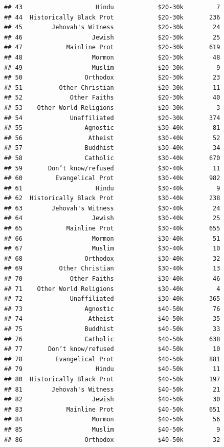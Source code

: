 \documentclass[12pt,letterpaperpaper,openany]{book}
\begin{document}
\begin{verbatim}
## 43                    Hindu            $20-30k         7
## 44  Historically Black Prot            $20-30k       236
## 45        Jehovah's Witness            $20-30k        24
## 46                   Jewish            $20-30k        25
## 47            Mainline Prot            $20-30k       619
## 48                   Mormon            $20-30k        48
## 49                   Muslim            $20-30k         9
## 50                 Orthodox            $20-30k        23
## 51          Other Christian            $20-30k        11
## 52             Other Faiths            $20-30k        40
## 53    Other World Religions            $20-30k         3
## 54             Unaffiliated            $20-30k       374
## 55                 Agnostic            $30-40k        81
## 56                  Atheist            $30-40k        52
## 57                 Buddhist            $30-40k        34
## 58                 Catholic            $30-40k       670
## 59       Don’t know/refused            $30-40k        11
## 60         Evangelical Prot            $30-40k       982
## 61                    Hindu            $30-40k         9
## 62  Historically Black Prot            $30-40k       238
## 63        Jehovah's Witness            $30-40k        24
## 64                   Jewish            $30-40k        25
## 65            Mainline Prot            $30-40k       655
## 66                   Mormon            $30-40k        51
## 67                   Muslim            $30-40k        10
## 68                 Orthodox            $30-40k        32
## 69          Other Christian            $30-40k        13
## 70             Other Faiths            $30-40k        46
## 71    Other World Religions            $30-40k         4
## 72             Unaffiliated            $30-40k       365
## 73                 Agnostic            $40-50k        76
## 74                  Atheist            $40-50k        35
## 75                 Buddhist            $40-50k        33
## 76                 Catholic            $40-50k       638
## 77       Don’t know/refused            $40-50k        10
## 78         Evangelical Prot            $40-50k       881
## 79                    Hindu            $40-50k        11
## 80  Historically Black Prot            $40-50k       197
## 81        Jehovah's Witness            $40-50k        21
## 82                   Jewish            $40-50k        30
## 83            Mainline Prot            $40-50k       651
## 84                   Mormon            $40-50k        56
## 85                   Muslim            $40-50k         9
## 86                 Orthodox            $40-50k        32

\end{verbatim}
\end{document}
